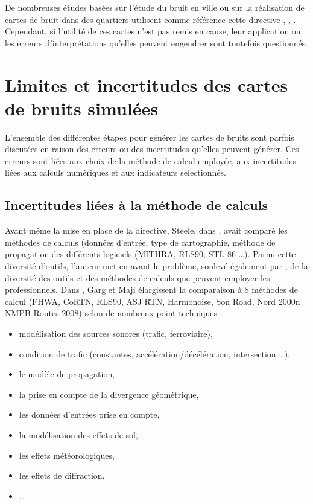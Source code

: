 De nombreuses études basées sur l'étude du bruit en ville ou sur la réalisation de cartes de bruit dans des quartiers utilisent comme référence cette directive \cite{murphy_environmental_2006}, \cite{murphy_estimating_2009}, \cite{Eriksson_residential_2013}. Cependant, si l'utilité de ces cartes n'est pas remis en cause, leur application ou les erreurs d'interprétations qu'elles peuvent engendrer sont toutefois questionnés.  

\section{Limites et incertitudes des cartes de bruits simulées}

L'ensemble des différentes étapes pour générer les cartes de bruits sont parfois discutées en raison des erreurs ou des incertitudes qu'elles peuvent générer. Ces erreurs sont liées aux choix de la méthode de calcul employée, aux incertitudes liées aux calculs numériques et aux indicateurs sélectionnés.

\subsection{Incertitudes liées à la méthode de calculs}

Avant même la mise en place de la directive, Steele, dans \cite{steele_critical_2001}, avait comparé les méthodes de calculs (données d'entrée, type de cartographie, méthode de propagation des différents logiciels (MITHRA, RLS90, STL-86 \dots). Parmi cette diversité d'outils, l'auteur met en avant le problème, soulevé également par \cite{king_implementation_2011}, de la diversité des outils et des méthodes de calculs que peuvent employer les professionnels. Dans \cite{garg_critical_2014}, Garg et Maji élargissent la comparaison à 8 méthodes de calcul (FHWA, CoRTN, RLS90, ASJ RTN, Harmonoise, Son Road, Nord 2000n NMPB-Routes-2008) selon de nombreux point techniques : 

\begin{itemize}
\item modélisation des sources sonores (trafic, ferroviaire), 
\item condition de trafic (constantes, accélération/décélération, intersection \dots), 
\item le modèle de propagation, 
\item la prise en compte de la divergence géométrique, 
\item les données d'entrées prise en compte, 
\item la modélisation des effets de sol,
\item les effets météorologiques,
\item les effets de diffraction,
\item \dots  \\
\end{itemize}

